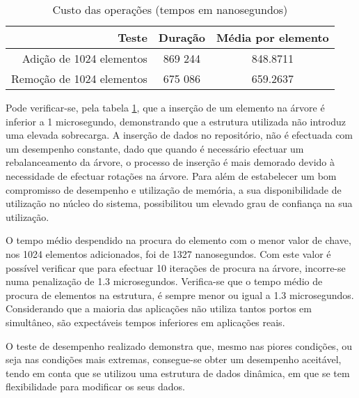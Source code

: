 \begin{table}[!htb]
\begin{center}
\caption{Custo das operações (tempos em nanosegundos)}
\begin{tabular}{ | r | c | c | }
\hline
\hspace{1cm} Teste \hspace{1.5cm} & \hspace{1cm}Duração\hspace{1cm} &  Média por
elemento \\
\hline
Adição de 1024 elementos & 869 244 & 848.8711 \\
\hline
Remoção de 1024 elementos & 675 086 & 659.2637\\
\hline

\hline
\end{tabular}
\label{tab:tree_info}
\end{center}
\end{table}

Pode verificar-se, pela tabela \ref{tab:tree_info}, que a inserção de um elemento na árvore é inferior a 1 microsegundo, demonstrando que a estrutura utilizada não introduz uma elevada sobrecarga.
A inserção de dados no repositório, não é efectuada com um desempenho constante, dado que quando é necessário efectuar um rebalanceamento da árvore, o processo de inserção é mais demorado devido à necessidade de efectuar rotações na árvore.
Para além de estabelecer um bom compromisso de desempenho e utilização de memória, a sua disponibilidade de utilização no núcleo do sistema, possibilitou um elevado grau de confiança na sua utilização.

O tempo médio despendido na procura do elemento com o menor valor de chave, nos 1024 elementos adicionados, foi de 1327 nanosegundos.
Com este valor é possível verificar que para efectuar 10 iterações de procura na árvore, incorre-se numa penalização de 1.3 microsegundos.
Verifica-se que o tempo médio de procura de elementos na estrutura, é sempre menor ou igual a 1.3 microsegundos.
Considerando que a maioria das aplicações não utiliza tantos portos em simultâneo, são expectáveis tempos inferiores em aplicações reais.

O teste de desempenho realizado demonstra que, mesmo nas piores condições, ou seja nas condições mais extremas, consegue-se obter um desempenho aceitável, tendo em conta que se utilizou uma estrutura de dados dinâmica, em que se tem flexibilidade para modificar os seus dados.


